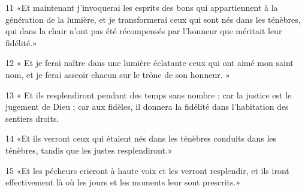 \par 11 «Et maintenant j'invoquerai les esprits des bons qui appartiennent à la génération de la lumière, et je transformerai ceux qui sont nés dans les ténèbres, qui dans la chair n'ont pas été récompensés par l'honneur que méritait leur fidélité.»
\par 12 « Et je ferai naître dans une lumière éclatante ceux qui ont aimé mon saint nom, et je ferai asseoir chacun sur le trône de son honneur. »
\par 13 « Et ils resplendiront pendant des temps sans nombre ; car la justice est le jugement de Dieu ; car aux fidèles, il donnera la fidélité dans l'habitation des sentiers droits.
\par 14 «Et ils verront ceux qui étaient nés dans les ténèbres conduits dans les ténèbres, tandis que les justes resplendiront.»
\par 15 «Et les pécheurs crieront à haute voix et les verront resplendir, et ils iront effectivement là où les jours et les moments leur sont prescrits.»

